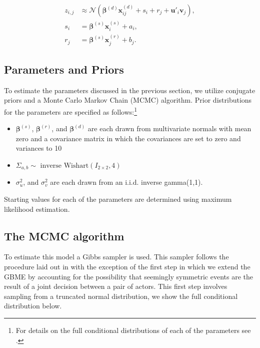 \documentclass[a4paper, 12pt]{article}
\begin{document}
\begin{align}
  z_{i,j} & \approx \mathcal{N}(\bm{\beta}^{(d)}\bm{x}_{ij}^{(d)} + s_{i} + r_{j} + \bm{u}'_i\bm{v}_j), \\
  s_{i} & = \bm{\beta}^{(s)}\bm{x}_i^{(s)} + a_{i}, \\
  r_{j} & = \bm{\beta}^{(s)}\bm{x}_j^{(r)} + b_{j}.
\end{align}

\subsection{Parameters and Priors}


To estimate the parameters discussed in the previous section, we utilize conjugate priors and a Monte Carlo Markov Chain (MCMC) algorithm. Prior distributions for the parameters are specified as follows:\footnote{For details on the full conditional distributions of each of the parameters see \citet{hoff:2005}.} 

\begin{itemize}
  \item $\bm{\beta}^{(s)}$, $\bm{\beta}^{(r)}$, and $\bm{\beta}^{(d)}$ are each drawn from multivariate normals with mean zero and a covariance matrix in which the covariances are set to zero and variances to 10
  \item $\Sigma_{a,b} \sim \text{ inverse Wishart}(I_{2\times 2}, 4)$
  \item $\sigma_u^2$, and $\sigma_v^2$ are each drawn from an i.i.d. inverse gamma(1,1).
\end{itemize}

Starting values for each of the parameters are determined using maximum likelihood estimation.

\subsection{The MCMC algorithm}

To estimate this model a Gibbs sampler is used. This sampler follows the procedure laid out in \citet{hoff:2005,hoff:2009} with the exception of the first step in which we extend the GBME by accounting for the possibility that seemingly symmetric events are the result of a joint decision between a pair of actors. This first step involves sampling from a truncated normal distribution, we show the full conditional distribution below.
\end{document}

